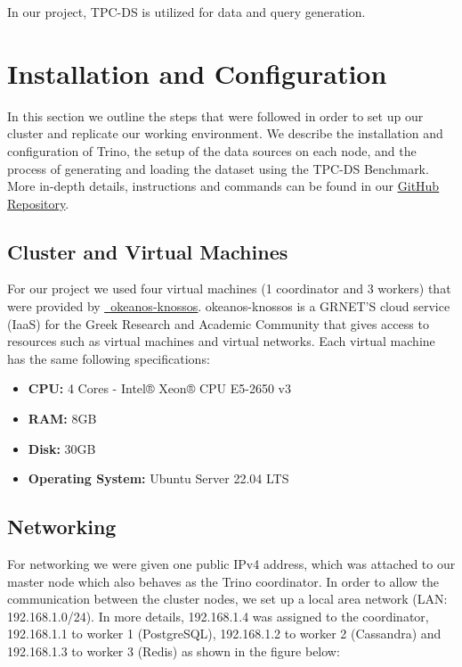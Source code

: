 \documentclass[conference]{IEEEtran}
\begin{document}
In our project, TPC-DS is utilized for data and query generation.

\section{Installation and Configuration}

In this section we outline the steps that were followed in order to set up our cluster and replicate our working
environment. We describe the installation and configuration of Trino, the setup of the data sources 
on each node, and the process of generating and loading the dataset using the TPC-DS Benchmark. 
More in-depth details, instructions and commands can be found in our \textcolor{linkblue}{\underline{\href{https://github.com/alex1on/Information-Systems-NTUA}{GitHub Repository}}}.
\subsection{Cluster and Virtual Machines}

For our project we used four virtual machines (1 coordinator and 3 workers) that were provided by \textcolor{linkblue}{\underline{\href{https://okeanos-knossos.grnet.gr/home/}{~okeanos-knossos}}}.
okeanos-knossos is a GRNET'S cloud service (IaaS) for the Greek Research and Academic Community that gives access to resources such as 
virtual machines and virtual networks. Each virtual machine has the same following specifications:

\begin{itemize}
    \item \textbf{CPU:} 4 Cores - Intel® Xeon® CPU E5-2650 v3
    \item \textbf{RAM:} 8GB
    \item \textbf{Disk:} 30GB
    \item \textbf{Operating System:} Ubuntu Server 22.04 LTS
\end{itemize}

\subsection{Networking}

For networking we were given one public IPv4 address, which was attached to our master node which also behaves as the Trino coordinator.
In order to allow the communication between the cluster nodes, we set up a local area network (LAN: 192.168.1.0/24). In more details,
192.168.1.4 was assigned to the coordinator, 192.168.1.1 to worker 1 (PostgreSQL), 192.168.1.2 to worker 2 (Cassandra) and 192.168.1.3 to worker 3 (Redis)
as shown in the figure below:
\end{document}
